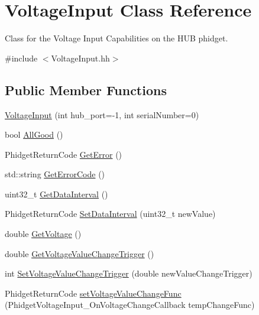 \hypertarget{classVoltageInput}{}\section{Voltage\+Input Class Reference}
\label{classVoltageInput}


Class for the Voltage Input Capabilities on the H\+UB phidget.  




{\ttfamily \#include $<$Voltage\+Input.\+hh$>$}

\subsection*{Public Member Functions}
\begin{DoxyCompactItemize}
\item 
\hyperlink{classVoltageInput_afaba264bd65b8552d34200eabb8b007b}{Voltage\+Input} (int hub\+\_\+port=-\/1, int serial\+Number=0)
\item 
bool \hyperlink{classVoltageInput_a35098eab2841bccd497184bc541d7fdf}{All\+Good} ()
\item 
Phidget\+Return\+Code \hyperlink{classVoltageInput_ae5772543560e4c8f13e6743c7e89faaf}{Get\+Error} ()
\item 
std\+::string \hyperlink{classVoltageInput_a99ee65d7c9b71585b9da294fa8a571b3}{Get\+Error\+Code} ()
\item 
uint32\+\_\+t \hyperlink{classVoltageInput_a95cb12ca2770091806097f91708881de}{Get\+Data\+Interval} ()
\item 
Phidget\+Return\+Code \hyperlink{classVoltageInput_a9065d8ae934ac67142d49c731533965d}{Set\+Data\+Interval} (uint32\+\_\+t new\+Value)
\item 
double \hyperlink{classVoltageInput_aaf13f9533502dd4de4a9ac1de6293f3f}{Get\+Voltage} ()
\item 
double \hyperlink{classVoltageInput_a7a54ecf272a33b2eaea82e455eaeb13f}{Get\+Voltage\+Value\+Change\+Trigger} ()
\item 
int \hyperlink{classVoltageInput_a529c29c46852bb170dbee6733cd176e3}{Set\+Voltage\+Value\+Change\+Trigger} (double new\+Value\+Change\+Trigger)
\item 
Phidget\+Return\+Code \hyperlink{classVoltageInput_a19840a54615035bc2da72a39c8b18452}{set\+Voltage\+Value\+Change\+Func} (Phidget\+Voltage\+Input\+\_\+\+On\+Voltage\+Change\+Callback temp\+Change\+Func)
\end{DoxyCompactItemize}


